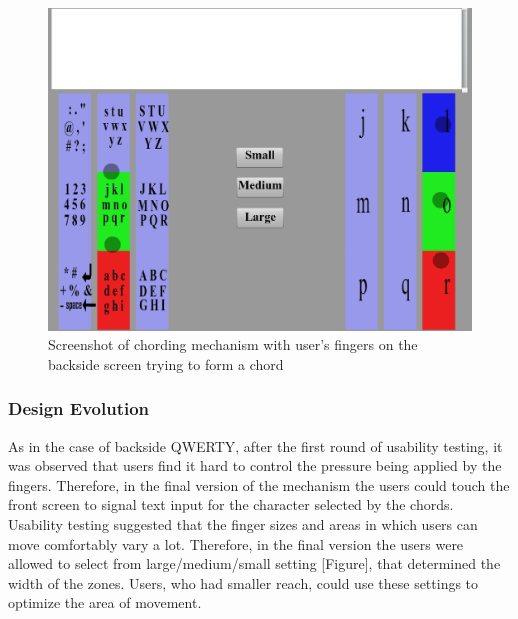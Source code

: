 \begin{figure}
    \includegraphics[scale=0.45]{Figures/chording.eps} 
  	\caption{Screenshot of chording mechanism with user's fingers on the backside screen trying to form a chord}
\end{figure} 
\subsubsection{Design Evolution}
As in the case of backside QWERTY, after the first round of usability testing, it was observed that users find it hard to control the pressure being applied by the fingers. Therefore, in the final version of the mechanism the users could touch the front screen to signal text input for the character selected by the chords.
Usability testing suggested that the finger sizes and areas in which users can move comfortably vary a lot. Therefore, in the final version the users were allowed to select from large/medium/small setting [Figure], that determined the width of the zones. Users, who had smaller reach, could use these settings to optimize the area of movement.